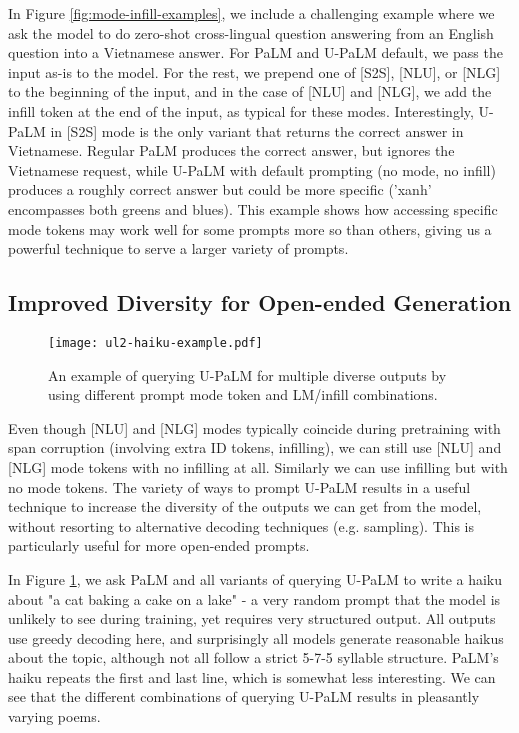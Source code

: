 \documentclass{article}
\newcommand{\modelname}{U-PaLM\xspace}
\begin{document}
In Figure \ref{fig:mode-infill-examples}, we include a challenging example where we ask the model to do zero-shot cross-lingual question answering from an English question into a Vietnamese answer. For PaLM and \modelname default, we pass the input as-is to the model. For the rest, we prepend one of [S2S], [NLU], or [NLG] to the beginning of the input, and in the case of [NLU] and [NLG], we add the infill token at the end of the input, as typical for these modes. Interestingly, \modelname in [S2S] mode is the only variant that returns the correct answer in Vietnamese. Regular PaLM produces the correct answer, but ignores the Vietnamese request, while \modelname with default prompting (no mode, no infill) produces a roughly correct answer but could be more specific ('xanh' encompasses both greens and blues). This example shows how accessing specific mode tokens may work well for some prompts more so than others, giving us a powerful technique to serve a larger variety of prompts.

\subsection{Improved Diversity for Open-ended Generation}
\begin{figure}[H]
\texttt{[image: ul2-haiku-example.pdf]}
\caption{An example of querying \modelname for multiple diverse outputs by using different prompt mode token and LM/infill combinations.}
\label{fig:haiku-examples}
\end{figure}

Even though [NLU] and [NLG] modes typically coincide during pretraining with span corruption (involving extra ID tokens, infilling), we can still use [NLU] and [NLG] mode tokens with no infilling at all. Similarly we can use infilling but with no mode tokens. The variety of ways to prompt \modelname results in a useful technique to increase the diversity of the outputs we can get from the model, without resorting to alternative decoding techniques (e.g. sampling). This is particularly useful for more open-ended prompts.

In Figure \ref{fig:haiku-examples}, we ask PaLM and all variants of querying \modelname to write a haiku about "a cat baking a cake on a lake" - a very random prompt that the model is unlikely to see during training, yet requires very structured output. All outputs use greedy decoding here, and surprisingly all models generate reasonable haikus about the topic, although not all follow a strict 5-7-5 syllable structure. PaLM's haiku repeats the first and last line, which is somewhat less interesting. We can see that the different combinations of querying \modelname results in pleasantly varying poems.
\end{document}
